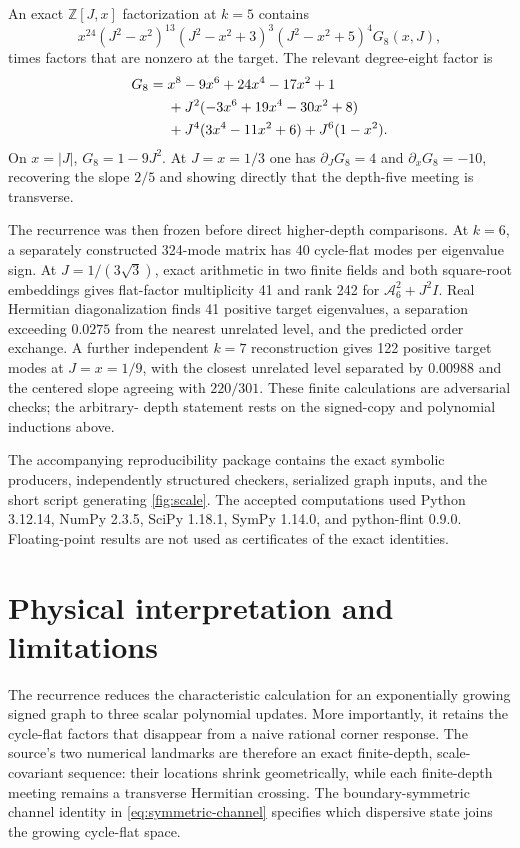 \documentclass[11pt]{article}
\theoremstyle{remark}
\newcommand{\Acal}{\mathcal{A}}
\newcommand{\Z}{\mathbb{Z}}
\begin{document}
An exact $\Z[J,x]$ factorization at $k=5$ contains
\begin{equation}
 x^{24}(J^2-x^2)^{13}(J^2-x^2+3)^3
 (J^2-x^2+5)^4G_8(x,J),
 \label{eq:k5-selected-factors}
\end{equation}
times factors that are nonzero at the target.  The relevant degree-eight
factor is
\begin{align}
 G_8={}&x^8-9x^6+24x^4-17x^2+1\notag\\
 &+J^2(-3x^6+19x^4-30x^2+8)\notag\\
 &+J^4(3x^4-11x^2+6)+J^6(1-x^2).
 \label{eq:G8}
\end{align}
On $x=|J|$, $G_8=1-9J^2$.  At $J=x=1/3$ one has
$\partial_JG_8=4$ and $\partial_xG_8=-10$, recovering the slope $2/5$ and
showing directly that the depth-five meeting is transverse.

The recurrence was then frozen before direct higher-depth comparisons.  At
$k=6$, a separately constructed 324-mode matrix has 40 cycle-flat modes per
eigenvalue sign.  At $J=1/(3\sqrt3)$, exact arithmetic in two finite fields
and both square-root embeddings gives flat-factor multiplicity 41 and rank
242 for $\Acal_6^2+J^2I$.  Real Hermitian diagonalization finds 41 positive
target eigenvalues, a separation exceeding $0.0275$ from the nearest unrelated
level, and the predicted order exchange.  A further independent $k=7$
reconstruction gives 122 positive target modes at $J=x=1/9$, with the closest
unrelated level separated by $0.00988$ and the centered slope agreeing with
$220/301$.  These finite calculations are adversarial checks; the arbitrary-
depth statement rests on the signed-copy and polynomial inductions above.

The accompanying reproducibility package contains the exact symbolic
producers, independently structured checkers, serialized graph inputs, and
the short script generating \cref{fig:scale}.  The accepted computations used
Python 3.12.14, NumPy 2.3.5, SciPy 1.18.1, SymPy 1.14.0, and python-flint
0.9.0.  Floating-point results are not used as certificates of the exact
identities.

\section{Physical interpretation and limitations}
\label{sec:discussion}

The recurrence reduces the characteristic calculation for an exponentially
growing signed graph to three scalar polynomial updates.  More importantly,
it retains the cycle-flat factors that disappear from a naive rational corner
response.  The source's two numerical landmarks are therefore an exact
finite-depth, scale-covariant sequence: their locations shrink geometrically,
while each finite-depth meeting remains a transverse Hermitian crossing.
The boundary-symmetric channel identity in \cref{eq:symmetric-channel}
specifies which dispersive state joins the growing cycle-flat space.
\end{document}
